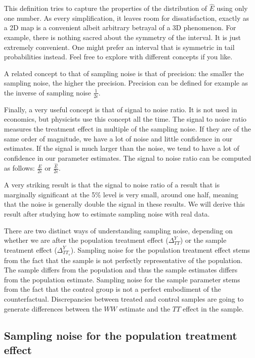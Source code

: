 \documentclass[]{book}
\theoremstyle{definition}
\theoremstyle{definition}
\theoremstyle{definition}
\theoremstyle{remark}
\let\BeginKnitrBlock\begin \let\EndKnitrBlock\end
\begin{document}
This definition tries to capture the properties of the distribution of
\(\hat{E}\) using only one number. As every simplification, it leaves
room for dissatisfaction, exactly as a 2D map is a convenient albeit
arbitrary betrayal of a 3D phenomenon. For example, there is nothing
sacred about the symmetry of the interval. It is just extremely
convenient. One might prefer an interval that is symmetric in tail
probabilities instead. Feel free to explore with different concepts if
you like.

A related concept to that of sampling noise is that of precision: the
smaller the sampling noise, the higher the precision. Precision can be
defined for example as the inverse of sampling noise
\(\frac{1}{2\epsilon}\).

Finally, a very useful concept is that of signal to noise ratio. It is
not used in economics, but physicists use this concept all the time. The
signal to noise ratio measures the treatment effect in multiple of the
sampling noise. If they are of the same order of magnitude, we have a
lot of noise and little confidence in our estimates. If the signal is
much larger than the noise, we tend to have a lot of confidence in our
parameter estimates. The signal to noise ratio can be computed as
follows: \(\frac{E}{2\epsilon}\) or \(\frac{\hat{E}}{2\epsilon}\).

\BeginKnitrBlock{remark}
\iffalse{} {Remark. } \fi{}A very striking result is that the signal to
noise ratio of a result that is marginally significant at the 5\% level
is very small, around one half, meaning that the noise is generally
double the signal in these results. We will derive this result after
studying how to estimate sampling noise with real data.
\EndKnitrBlock{remark}

There are two distinct ways of understanding sampling noise, depending
on whether we are after the population treatment effect
(\(\Delta^Y_{TT}\)) or the sample treatment effect
(\(\Delta^Y_{TT_s}\)). Sampling noise for the population treatment
effect stems from the fact that the sample is not perfectly
representative of the population. The sample differs from the population
and thus the sample estimates differs from the population estimate.
Sampling noise for the sample parameter stems from the fact that the
control group is not a perfect embodiment of the counterfactual.
Discrepancies between treated and control samples are going to generate
differences between the \(WW\) estimate and the \(TT\) effect in the
sample.

\subsection{Sampling noise for the population treatment
effect}\label{sec:illusnoisepop}
\end{document}
